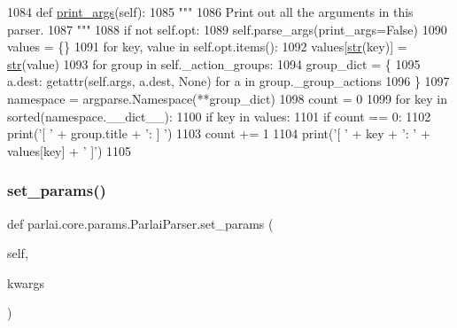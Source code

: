 \begin{DoxyCode}
1084     \textcolor{keyword}{def }\hyperlink{namespaceparlai_1_1scripts_1_1data__stats_a56b1df909ab791a73bd6c2d5d4776531}{print\_args}(self):
1085         \textcolor{stringliteral}{"""}
1086 \textcolor{stringliteral}{        Print out all the arguments in this parser.}
1087 \textcolor{stringliteral}{        """}
1088         \textcolor{keywordflow}{if} \textcolor{keywordflow}{not} self.opt:
1089             self.parse\_args(print\_args=\textcolor{keyword}{False})
1090         values = \{\}
1091         \textcolor{keywordflow}{for} key, value \textcolor{keywordflow}{in} self.opt.items():
1092             values[\hyperlink{namespacegenerate__task__READMEs_a5b88452ffb87b78c8c85ececebafc09f}{str}(key)] = \hyperlink{namespacegenerate__task__READMEs_a5b88452ffb87b78c8c85ececebafc09f}{str}(value)
1093         \textcolor{keywordflow}{for} group \textcolor{keywordflow}{in} self.\_action\_groups:
1094             group\_dict = \{
1095                 a.dest: getattr(self.args, a.dest, \textcolor{keywordtype}{None}) \textcolor{keywordflow}{for} a \textcolor{keywordflow}{in} group.\_group\_actions
1096             \}
1097             namespace = argparse.Namespace(**group\_dict)
1098             count = 0
1099             \textcolor{keywordflow}{for} key \textcolor{keywordflow}{in} sorted(namespace.\_\_dict\_\_):
1100                 \textcolor{keywordflow}{if} key \textcolor{keywordflow}{in} values:
1101                     \textcolor{keywordflow}{if} count == 0:
1102                         print(\textcolor{stringliteral}{'[ '} + group.title + \textcolor{stringliteral}{': ] '})
1103                     count += 1
1104                     print(\textcolor{stringliteral}{'[  '} + key + \textcolor{stringliteral}{': '} + values[key] + \textcolor{stringliteral}{' ]'})
1105 
\end{DoxyCode}
\mbox{\label{classparlai_1_1core_1_1params_1_1ParlaiParser_a6f1dc42e86af57a7fc4ef9a4c68ca247}} 
\subsubsection{\texorpdfstring{set\+\_\+params()}{set\_params()}}
{\footnotesize\ttfamily def parlai.\+core.\+params.\+Parlai\+Parser.\+set\+\_\+params (\begin{DoxyParamCaption}\item[{}]{self,  }\item[{}]{kwargs }\end{DoxyParamCaption})}

